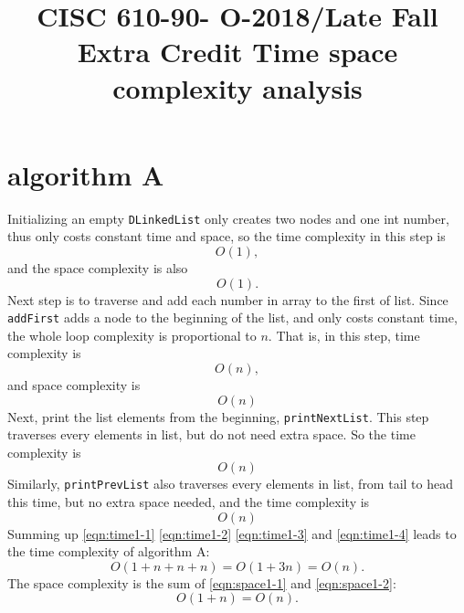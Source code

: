\documentclass[natbib,12pt]{article}
\title{CISC 610-90- O-2018/Late Fall \linebreak Extra Credit \linebreak Time \/ space complexity analysis}
\date{}
\begin{document}
\maketitle
	
\section{algorithm A}
	Initializing an empty {\tt DLinkedList} only creates two nodes and one int number, thus only costs constant time and space, so the time complexity in this step is
	\begin{equation}
		O(1),  \label{eqn:time1-1}
	\end{equation}
	and the space complexity is also 
	\begin{equation}
		O(1). \label{eqn:space1-1}
	\end{equation}
	Next step is to traverse and add each number in array to the first of list. Since {\tt addFirst} adds a node to the beginning of the list, and only costs constant time, the whole loop complexity is proportional to $n$. That is, in this step, time complexity is
	\begin{equation}
		O(n), \label{eqn:time1-2}
	\end{equation}
	and space complexity is
	\begin{equation}
		O(n) \label{eqn:space1-2}
	\end{equation}
	Next, print the list elements from the beginning, {\tt printNextList}. This step traverses every elements in list, but do not need extra space. So the time complexity is
	\begin{equation}
		O(n) \label{eqn:time1-3}
	\end{equation}
		Similarly, {\tt printPrevList} also traverses every elements in list, from tail to head this time, but no extra space needed, and the time complexity is
	\begin{equation}
		O(n) \label{eqn:time1-4}
	\end{equation}
	Summing up \eqref{eqn:time1-1} \eqref{eqn:time1-2} \eqref{eqn:time1-3} and \eqref{eqn:time1-4} leads to the time complexity of algorithm A:
	\begin{equation}
		O(1 + n + n + n) = O(1 + 3n) = O(n).
	\end{equation}
	The space complexity is the sum of \eqref{eqn:space1-1} and \eqref{eqn:space1-2}:
	\begin{equation}
		O(1 + n) = O(n).
	\end{equation}
\end{document}
